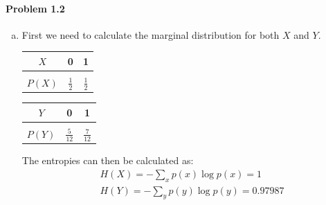 \documentclass[12pt, letterpaper]{scrartcl}
\begin{document}
\paragraph*{Problem 1.2} \hfill
\begin{enumerate}[a.]
    \item First we need to calculate the marginal distribution for both $X$ and $Y$.
    \begin{center}
        \begin{tabular}{c|cc}
        $X$    & 0             & 1             \\ \hline 
         \\[-1em]
        $P(X)$ & $\frac{1}{2}$ & $\frac{1}{2}$ \\
        \end{tabular}
        \qquad
        \begin{tabular}{c|cc}
        \textbf{$Y$}    & 0              & 1              \\ \hline
         \\[-1em]
        \textbf{$P(Y)$} & $\frac{5}{12}$ & $\frac{7}{12}$ \\
        \end{tabular}
    \end{center}
    
    The entropies can then be calculated as:
    \begin{align*}
        &H(X)=-\sum_{x} p(x)\log p(x)=1\\
        &H(Y)=-\sum_{y} p(y)\log p(y)=0.97987
    \end{align*}


\end{enumerate}
\end{document}
